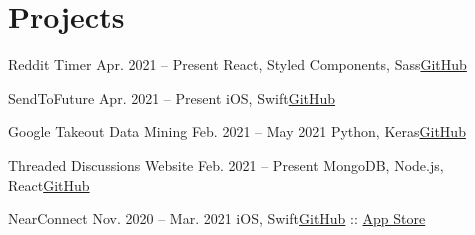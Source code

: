 
\newif\ifshowchips
\showchipsfalse

\newcommand{\javascript}{\ifshowchips \fcolorbox{js}{js}{\bf \scriptsize JS} \fi}
\newcommand{\python}{\ifshowchips \fcolorbox{py}{py}{\bf \scriptsize \textcolor{white}{Python}} \fi}
\newcommand{\swift}{\ifshowchips \fcolorbox{swift}{swift}{\bf \scriptsize Swift} \fi}
\newcommand{\vbnet}{\ifshowchips \fcolorbox{vb}{vb}{\bf \scriptsize \textcolor{white}{VB.NET}} \fi}
\newcommand{\cpp}{\ifshowchips \fcolorbox{cpp}{cpp}{\bf \scriptsize C++} \fi}

\section{Projects}
  \resumeSubHeadingListStart
    \resumeSubheading
      {Reddit Timer \javascript}{Apr. 2021 -- Present}
      {React, Styled Components, Sass}{\href{https://github.com/profydev/reddit-timer-yrahul3910}{GitHub}}
  
    \resumeSubheading
      {SendToFuture \swift}{Apr. 2021 -- Present}
      {iOS, Swift}{\href{https://github.com/yrahul3910/send-to-future}{GitHub}}
      
    \resumeSubheading
      {Google Takeout Data Mining \python}{Feb. 2021 -- May 2021}
      {Python, Keras}{\href{https://github.com/yrahul3910/google-takeout-data-mining}{GitHub}}
      
    \resumeSubheading
      {Threaded Discussions Website \javascript}{Feb. 2021 -- Present}
      {MongoDB, Node.js, React}{\href{https://github.com/yrahul3910/threaded-discussions}{GitHub}}
  
    \resumeSubheading
      {NearConnect \swift}{Nov. 2020 -- Mar. 2021}
      {iOS, Swift}{\href{https://github.com/yrahul3910/socialqr}{GitHub} :: \href{https://apps.apple.com/us/app/nearconnect/id1547157546}{App Store}}
    
